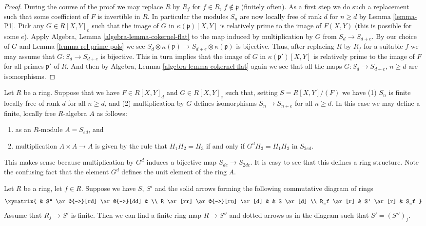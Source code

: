 \begin{proof}
During the course of the proof we may replace $R$ by $R_f$
for $f\in R$, $f\not\in \mathfrak p$ (finitely often).
As a first step we do such a replacement such that
some coefficient of $F$ is invertible in $R$.
In particular the modules $S_n$ are now locally
free of rank $d$ for $n \geq d$ by Lemma \ref{lemma-P1}.
Pick any $G \in R[X, Y]_e$ such that the image of
$G$ in $\kappa(\mathfrak p)[X, Y]$ is relatively
prime to the image of $F(X, Y)$ (this is possible for some $e$).
Apply Algebra, Lemma \ref{algebra-lemma-cokernel-flat} to the map
induced by multiplication by $G$ from $S_d \to S_{d + e}$.
By our choice of $G$ and Lemma \ref{lemma-rel-prime-pols}
we see
$S_d \otimes \kappa(\mathfrak p) \to S_{d + e} \otimes \kappa(\mathfrak p)$
is bijective. Thus, after replacing $R$ by $R_f$ for a suitable
$f$ we may assume that $G : S_d \to S_{d + e}$
is bijective. This in turn implies that the image
of $G$ in $\kappa(\mathfrak p')[X, Y]$ is relatively
prime to the image of $F$ for all primes $\mathfrak p'$
of $R$. And then by Algebra, Lemma \ref{algebra-lemma-cokernel-flat}
again we see that all the maps
$G : S_d \to S_{d + e}$, $n \geq d$ are isomorphisms.
\end{proof}

\begin{remark}
\label{remark-algebra}
Let $R$ be a ring. Suppose that we have $F \in R[X, Y]_d$
and $G \in R[X, Y]_e$ such that, setting $S = R[X, Y]/(F)$
we have (1) $S_n$ is finite locally free of rank $d$ for
all $n \geq d$, and (2) multiplication by $G$ defines
isomorphisms $S_n \to S_{n + e}$ for all $n \geq d$. In this
case we may define a finite, locally free $R$-algebra
$A$ as follows:
\begin{enumerate}
\item as an $R$-module $A = S_{ed}$, and
\item multiplication $A \times A \to A$ is given by
the rule that $H_1 H_2 = H_3$ if and only if $G^d H_3 = H_1 H_2$
in $S_{2ed}$.
\end{enumerate}
This makes sense because multiplication by $G^d$
induces a bijective map $S_{de} \to S_{2de}$.
It is easy to see that this defines a ring structure.
Note the confusing fact that the element $G^d$
defines the unit element of the ring $A$.
\end{remark}

\begin{lemma}
\label{lemma-finite-after-localization}
Let $R$ be a ring, let $f \in R$.
Suppose we have $S$, $S'$ and the solid arrows
forming the following commutative diagram of rings
$$
\xymatrix{
& S'' \ar@{-->}[rd] \ar@{-->}[dd] &
\\
R \ar[rr] \ar@{-->}[ru] \ar[d] &  & S \ar[d]
\\
R_f \ar[r] & S' \ar[r] & S_f
}
$$
Assume that $R_f \to S'$ is finite. Then we can find
a finite ring map $R \to S''$ and dotted arrows as
in the diagram such that $S' = (S'')_f$.
\end{lemma}

